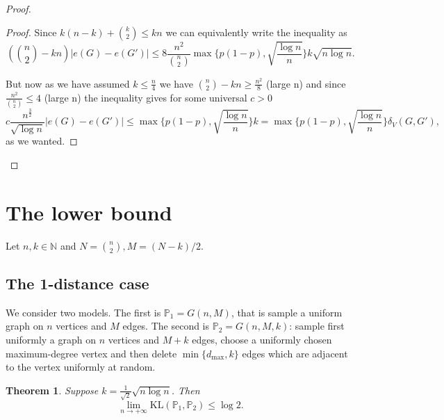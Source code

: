 \documentclass[12pt,a4paper]{article}
\newtheorem{theorem}{Theorem}[section]
\numberwithin{equation}{section}
\numberwithin{equation}{section}
\newcommand{\1}{{\text{\Large $\mathfrak 1$}}}
\newcommand{\2}[1]{{\text{\Large $\mathfrak 1$}\!\left(#1\right)}}
\begin{document}
\begin{proof}
\begin{proof}
Since  $ k(n-k)+\binom{k}{2} \leq kn$ we can equivalently write the inequality as
$$\left( \binom{n}{2}-kn \right)|e(G)-e(G')| \leq 8 \frac{n^2}{\binom{n}{2}} \max\{p(1-p),\sqrt{\frac{\log n}{n}}\} k  \sqrt{n \log n}.$$

But now as we have assumed $k \leq \frac{n}{4}$ we have $\binom{n}{2}-kn \geq \frac{n^2}{8}$ (large n) and since $\frac{n^2}{\binom{n}{2}} \leq 4$ (large n) the inequality gives 
for some universal $c>0$
$$c\frac{n^{\frac{3}{2}}}{\sqrt{\log n}}|e(G)-e(G')| \leq  \max\{p(1-p),\sqrt{\frac{\log n}{n}}\} k  =\max\{p(1-p),\sqrt{\frac{\log n}{n}}\} \delta_V(G,G'),$$
as we wanted.


\end{proof}




\end{proof}


\section{The lower bound}
Let $n,k \in \mathbb{N}$ and $N=\binom{n}{2},M=(N-k)/2$.

\subsection{The 1-distance case}
We consider two models. The first is $\mathbb{P}_1=G(n,M)$, that is sample a uniform graph on $n$ vertices and $M$ edges. The second is $\mathbb{P}_2=G(n,M,k)$: sample first uniformly a graph on $n$ vertices and $M+k$ edges, choose a uniformly chosen maximum-degree vertex and then delete $\min\{ d_{\mathrm{max}},k\}$ edges which are adjacent to the vertex uniformly at random. 


\begin{theorem}
Suppose $k=\frac{1}{\sqrt{2}}\sqrt{n \log n}$. Then $$ \lim_{n \rightarrow +\infty} \mathrm{KL}\left(\mathbb{P}_1,\mathbb{P}_2\right) \leq \log 2.$$
\end{theorem}
\end{document}
